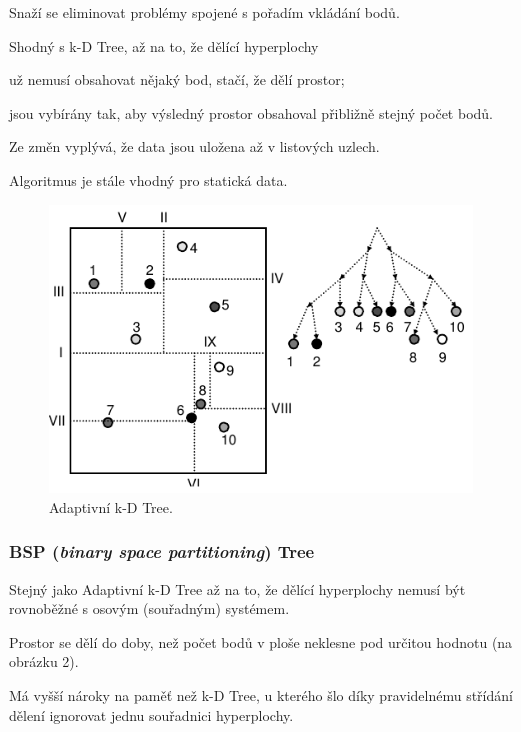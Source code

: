 \begin{compactitem}
    \item Snaží se eliminovat problémy spojené s pořadím vkládání bodů.
    \item Shodný s k-D Tree, až na to, že dělící hyperplochy \begin{compactitem}
        \item už nemusí obsahovat nějaký bod, stačí, že dělí prostor;
        \item jsou vybírány tak, aby výsledný prostor obsahoval přibližně stejný počet bodů.
    \end{compactitem}
    \item Ze změn vyplývá, že data jsou uložena až v listových uzlech.
    \item Algoritmus je stále vhodný pro statická data.
\end{compactitem}

\begin{figure}[H]
    \centering
    \includegraphics[width=0.75\linewidth]{adaptivni_kd_tree.pdf}
    \caption{Adaptivní k-D Tree.}
\end{figure}

\subsubsection{BSP (\textit{binary space partitioning}) Tree}

\begin{compactitem}
    \item Stejný jako Adaptivní k-D Tree až na to, že dělící hyperplochy nemusí být rovnoběžné s osovým (souřadným) systémem.
    \item Prostor se dělí do doby, než počet bodů v ploše neklesne pod určitou hodnotu (na obrázku 2).
    \item Má vyšší nároky na paměť než k-D Tree, u kterého šlo díky pravidelnému střídání dělení ignorovat jednu souřadnici hyperplochy.
\end{compactitem}

